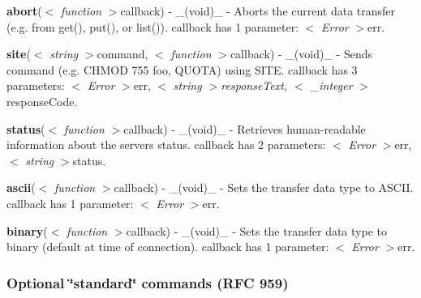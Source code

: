 \begin{DoxyItemize}
\item {\bfseries abort}($<$ {\itshape function} $>$callback) -\/ \+\_\+(void)\+\_\+ -\/ Aborts the current data transfer (e.\+g. from get(), put(), or list()). {\ttfamily callback} has 1 parameter\+: $<$ {\itshape Error} $>$err.
\item {\bfseries site}($<$ {\itshape string} $>$command, $<$ {\itshape function} $>$callback) -\/ \+\_\+(void)\+\_\+ -\/ Sends {\ttfamily command} (e.\+g. \textquotesingle{}C\+H\+M\+OD 755 foo\textquotesingle{}, \textquotesingle{}Q\+U\+O\+TA\textquotesingle{}) using S\+I\+TE. {\ttfamily callback} has 3 parameters\+: $<$ {\itshape Error} $>$err, $<$ {\itshape string $>$response\+Text, $<$ \+\_\+integer} $>$response\+Code.
\item {\bfseries status}($<$ {\itshape function} $>$callback) -\/ \+\_\+(void)\+\_\+ -\/ Retrieves human-\/readable information about the server\textquotesingle{}s status. {\ttfamily callback} has 2 parameters\+: $<$ {\itshape Error} $>$err, $<$ {\itshape string} $>$status.
\item {\bfseries ascii}($<$ {\itshape function} $>$callback) -\/ \+\_\+(void)\+\_\+ -\/ Sets the transfer data type to A\+S\+C\+II. {\ttfamily callback} has 1 parameter\+: $<$ {\itshape Error} $>$err.
\item {\bfseries binary}($<$ {\itshape function} $>$callback) -\/ \+\_\+(void)\+\_\+ -\/ Sets the transfer data type to binary (default at time of connection). {\ttfamily callback} has 1 parameter\+: $<$ {\itshape Error} $>$err.
\end{DoxyItemize}

\subsubsection*{Optional \char`\"{}standard\char`\"{} commands (R\+FC 959)}


